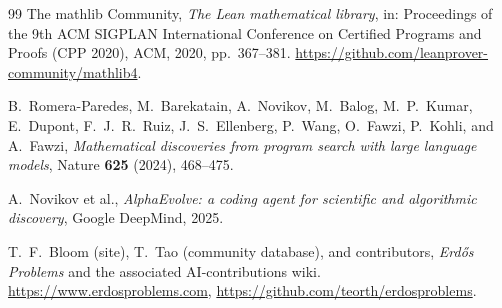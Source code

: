 \documentclass[11pt]{article}
\theoremstyle{plain}
\theoremstyle{definition}
\theoremstyle{remark}
\numberwithin{equation}{section}
\begin{document}
\begin{thebibliography}{99}
The mathlib Community, \emph{The Lean mathematical library},
in: Proceedings of the 9th ACM SIGPLAN International Conference on Certified Programs and Proofs
(CPP 2020), ACM, 2020, pp.~367--381.
\url{https://github.com/leanprover-community/mathlib4}.

B.~Romera-Paredes, M.~Barekatain, A.~Novikov, M.~Balog, M.~P.~Kumar, E.~Dupont, F.~J.~R.~Ruiz,
J.~S.~Ellenberg, P.~Wang, O.~Fawzi, P.~Kohli, and A.~Fawzi,
\emph{Mathematical discoveries from program search with large language models},
Nature \textbf{625} (2024), 468--475.

A.~Novikov et al., \emph{AlphaEvolve: a coding agent for scientific and algorithmic discovery},
Google DeepMind, 2025.

T.~F.~Bloom (site), T.~Tao (community database), and contributors, \emph{Erd\H{o}s Problems} and the associated
AI-contributions wiki. \url{https://www.erdosproblems.com},
\url{https://github.com/teorth/erdosproblems}.

\end{thebibliography}
\end{document}
